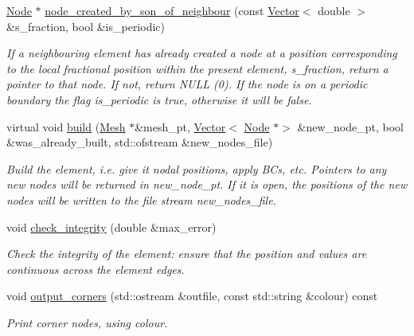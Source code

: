 \begin{DoxyCompactItemize}
\hyperlink{classoomph_1_1Node}{Node} $\ast$ \hyperlink{classoomph_1_1RefineableQElement_3_011_01_4_a0c1fee29155e53b1c03bac851080cbd0}{node\+\_\+created\+\_\+by\+\_\+son\+\_\+of\+\_\+neighbour} (const \hyperlink{classoomph_1_1Vector}{Vector}$<$ double $>$ \&s\+\_\+fraction, bool \&is\+\_\+periodic)
\begin{DoxyCompactList}\small\item\em If a neighbouring element has already created a node at a position corresponding to the local fractional position within the present element, s\+\_\+fraction, return a pointer to that node. If not, return N\+U\+LL (0). If the node is on a periodic boundary the flag is\+\_\+periodic is true, otherwise it will be false. \end{DoxyCompactList}\item 
virtual void \hyperlink{classoomph_1_1RefineableQElement_3_011_01_4_aa2104bae648ac4b34caecbbb5fb254dc}{build} (\hyperlink{classoomph_1_1Mesh}{Mesh} $\ast$\&mesh\+\_\+pt, \hyperlink{classoomph_1_1Vector}{Vector}$<$ \hyperlink{classoomph_1_1Node}{Node} $\ast$$>$ \&new\+\_\+node\+\_\+pt, bool \&was\+\_\+already\+\_\+built, std\+::ofstream \&new\+\_\+nodes\+\_\+file)
\begin{DoxyCompactList}\small\item\em Build the element, i.\+e. give it nodal positions, apply B\+Cs, etc. Pointers to any new nodes will be returned in new\+\_\+node\+\_\+pt. If it is open, the positions of the new nodes will be written to the file stream new\+\_\+nodes\+\_\+file. \end{DoxyCompactList}\item 
void \hyperlink{classoomph_1_1RefineableQElement_3_011_01_4_a64d91c3deb6f1c7532b77f9e673bb150}{check\+\_\+integrity} (double \&max\+\_\+error)
\begin{DoxyCompactList}\small\item\em Check the integrity of the element\+: ensure that the position and values are continuous across the element edges. \end{DoxyCompactList}\item 
void \hyperlink{classoomph_1_1RefineableQElement_3_011_01_4_aa1ec4cdf297f9061f41c6e6cccb087e9}{output\+\_\+corners} (std\+::ostream \&outfile, const std\+::string \&colour) const
\begin{DoxyCompactList}\small\item\em Print corner nodes, using colour. \end{DoxyCompactList}\item 
$$
\end{DoxyCompactItemize}
